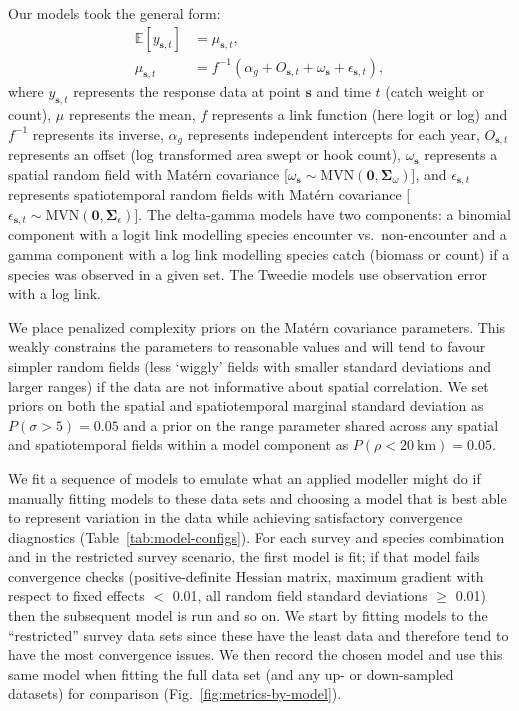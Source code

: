 \documentclass[12pt]{article}
\begin{document}
Our models took the general form:
\begin{align}
\mathbb{E}[y_{\boldsymbol{s},t}] &= \mu_{\boldsymbol{s},t},\\
\mu_{\boldsymbol{s},t} &=
f^{-1} \left(
\alpha_g +
O_{\boldsymbol{s},t} +
\omega_{\boldsymbol{s}} +
\epsilon_{\boldsymbol{s},t} \right),
\end{align}
\noindent
where
$y_{\boldsymbol{s},t}$ represents the response data at point $\boldsymbol{s}$ and time $t$ (catch weight or count),
$\mu$ represents the mean,
$f$ represents a link function (here logit or log) and $f^{-1}$ represents its inverse,
$\alpha_{g}$ represents independent intercepts for each year,
$O_{\boldsymbol{s},t}$ represents an offset (log transformed area swept or hook
count),
$\omega_{\boldsymbol{s}}$ represents a spatial random field with Mat\'ern covariance [$\omega_{\boldsymbol{s}} \sim \mathrm{MVN}(\boldsymbol{0},\boldsymbol{\Sigma}_\omega)$],
and $\epsilon_{\boldsymbol{s},t}$ represents spatiotemporal random fields with Mat\'ern covariance [$\epsilon_{\boldsymbol{s},t} \sim \mathrm{MVN}(\boldsymbol{0},\boldsymbol{\Sigma}_{\epsilon})$].
The delta-gamma models have two components: a binomial component with a logit link modelling species encounter vs.\ non-encounter and a gamma component with a log link modelling species catch (biomass or count) if a species was observed in a given set.
The Tweedie models use \citet{tweedie1984} observation error with a log link.

We place penalized complexity priors \citep{fuglstad2019} on the Mat\'ern covariance parameters. This weakly constrains the parameters to reasonable values and will tend to favour simpler random fields (less `wiggly' fields with smaller standard deviations and larger ranges) if the data are not informative about spatial correlation. We set priors on both the spatial and spatiotemporal marginal standard deviation as $P(\sigma > 5) = 0.05$ and a prior on the range parameter shared across any spatial and spatiotemporal fields within a model component as $P(\rho < 20\ \mathrm{km}) = 0.05$.

We fit a sequence of models to emulate what an applied modeller might do if manually fitting models to these data sets and choosing a model that is best able to represent variation in the data while achieving satisfactory convergence diagnostics (Table~\ref{tab:model-configs}). For each survey and species combination and in the restricted survey scenario, the first model is fit; if that model fails convergence checks (positive-definite Hessian matrix, maximum gradient with respect to fixed effects $<$ 0.01, all random field standard deviations $\ge$ 0.01) then the subsequent model is run and so on. We start by fitting models to the ``restricted'' survey data sets since these have the least data and therefore tend to have the most convergence issues. We then record the chosen model and use this same model when fitting the full data set (and any up- or down-sampled datasets) for comparison (Fig.~\ref{fig:metrics-by-model}).
\end{document}
